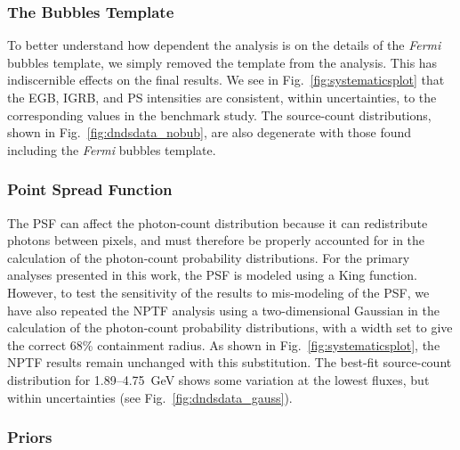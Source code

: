 \subsubsection{The Bubbles Template}

To better understand how dependent the analysis is on the details of the \emph{Fermi} bubbles template, we simply removed the template from the analysis.  This has indiscernible effects on the final results.  We see in Fig.~\ref{fig:systematicsplot} that the EGB, IGRB, and PS intensities are consistent, within uncertainties, to the corresponding values in the benchmark study.  The source-count distributions, shown in Fig.~\ref{fig:dndsdata_nobub}, are also degenerate with those found including the \emph{Fermi} bubbles template.   

\subsubsection{Point Spread Function}

The PSF can affect the photon-count distribution because it can redistribute photons between pixels, and must therefore be properly accounted for in the calculation of the photon-count probability distributions.  For the primary analyses presented in this work, the PSF is modeled using a King function.  However, to test the sensitivity of the results to mis-modeling of the PSF, we have also repeated the NPTF analysis using a two-dimensional Gaussian in the calculation of the photon-count probability distributions, with a width set to give the correct 68\% containment radius.  As shown in Fig.~\ref{fig:systematicsplot}, the NPTF results remain unchanged with this substitution.  The best-fit source-count distribution for 1.89--4.75~GeV shows some variation at the lowest fluxes, but within uncertainties (see Fig.~\ref{fig:dndsdata_gauss}).    

\subsubsection{Priors}

